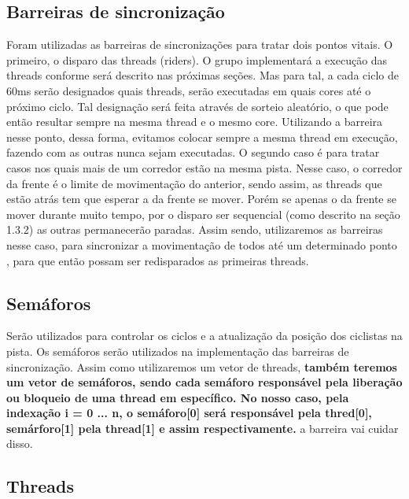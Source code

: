 \documentclass[12pt,a4paper]{article}
\begin{document}
\subsection{Barreiras de sincronização}
	Foram utilizadas as barreiras de sincronizações para tratar dois pontos vitais. O primeiro, o disparo das threads (riders). O grupo implementará a execução das threads conforme será descrito nas próximas seções. Mas para tal, a cada ciclo de 60ms serão designados quais threads, serão executadas em quais cores até o próximo ciclo. Tal designação será feita através de sorteio aleatório, o que pode então resultar sempre na mesma thread e o mesmo core. Utilizando a barreira nesse ponto, dessa forma, evitamos colocar sempre a mesma thread em execução, fazendo com as outras nunca sejam executadas.
    O segundo caso é para tratar casos nos quais mais de um corredor estão na mesma pista. Nesse caso, o corredor da frente é o limite de movimentação do anterior, sendo assim, as threads que estão atrás tem que esperar a da frente se mover. Porém se apenas o da frente se mover durante muito tempo, por o disparo ser sequencial (como descrito na seção 1.3.2) as outras permanecerão paradas. Assim sendo, utilizaremos as barreiras nesse caso, para sincronizar a movimentação de todos até um determinado ponto , para que então possam ser redisparados as primeiras threads. 

\subsection{Semáforos}
	Serão utilizados para controlar os ciclos e a atualização da posição dos ciclistas na pista.
	Os semáforos serão utilizados na implementação das barreiras de sincronização. Assim como utilizaremos um vetor de threads, \textbf{também teremos um vetor de semáforos, sendo cada semáforo responsável pela liberação ou bloqueio de uma thread em específico. No nosso caso, pela indexação i = 0 ... n, o semáforo[0] será responsável pela thred[0], semárforo[1] pela thread[1] e assim respectivamente. 
} a barreira vai cuidar disso.
\subsection{Threads}
\end{document}
